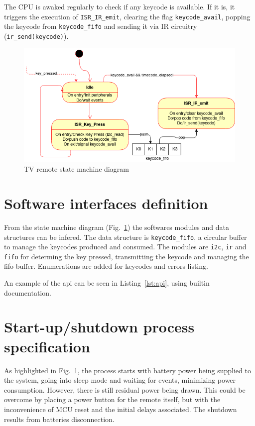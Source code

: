 The CPU is awaked regularly to check if any keycode is available. If it is, it
triggers the execution of \texttt{ISR\_IR\_emit}, clearing the flag
\texttt{keycode\_avail}, popping the keycode from \texttt{keycode\_fifo} and
sending it via IR circuitry (\texttt{ir\_send(keycode)}).
%
  \vspace{-5mm}
%  
\begin{figure}[htb!]
\centering
    \includegraphics[width=0.7\columnwidth]{./img/state-mach.png}
  \caption{TV remote state machine diagram}%
\label{fig:state-mach}
\end{figure}
%
  \vspace{-5mm}
%  
\section{Software interfaces definition}
\label{sec:sw-interf-def}
%
From the state machine diagram (Fig.~\ref{fig:state-mach}) the softwares modules
and data structures can be infered. The data structure is \texttt{keycode\_fifo},
a circular buffer to manage the keycodes produced and consumed. The modules are
\texttt{i2c}, \texttt{ir} and \texttt{fifo} for determing the key pressed,
transmitting the keycode and managing the \gls{fifo} buffer. Enumerations are
added for keycodes and errors listing.

An example of the \gls{api} can be seen in Listing~\ref{lst:api}, using builtin documentation.
%
%

\section{Start-up/shutdown process specification}
\label{sec:startup-shutdown}
As highlighted in Fig.~\ref{fig:state-mach}, the process starts with battery
power being supplied to the system, going into sleep mode and waiting for
events, minimizing power consumption. However, there is still residual power
being drawn. This could be overcome by placing a power button for the remote
itself, but with the inconvenience of MCU reset and the initial delays
associated. The shutdown results from batteries disconnection.
%
  \vspace{-5mm}
%  
